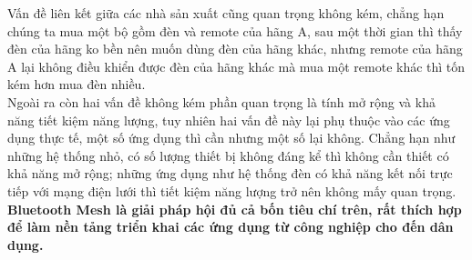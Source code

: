     Vấn đề liên kết giữa các nhà sản xuất cũng quan trọng không kém, chẳng hạn chúng ta mua một bộ gồm đèn và remote của hãng A, sau một thời gian thì thấy đèn của hãng ko bền nên muốn dùng đèn của hãng khác, nhưng remote của hãng A lại không điều khiển được đèn của hãng khác mà mua một remote khác thì tốn kém hơn mua đèn nhiều.\\
    
    Ngoài ra còn hai vấn đề không kém phần quan trọng là tính mở rộng và khả năng tiết kiệm năng lượng, tuy nhiên hai vấn đề này lại phụ thuộc vào các ứng dụng thực tế, một số ứng dụng thì cần nhưng một số lại không. Chẳng hạn như những hệ thống nhỏ, có số lượng thiết bị không đáng kể thì không cần thiết có khả năng mở rộng; những ứng dụng như hệ thống đèn có khả năng kết nối trực tiếp với mạng điện lưới thì tiết kiệm năng lượng trở nên không mấy quan trọng.\\
    
     \textbf{Bluetooth Mesh là giải pháp hội đủ cả bốn tiêu chí trên, rất thích hợp để làm nền tảng triển khai các ứng dụng từ công nghiệp cho đến dân dụng.}
